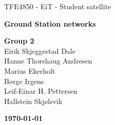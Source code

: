 \begin{titlepage}
\begin{center}

\vspace*{6cm}
{\Huge TFE4850 - EiT - Student satellite}

\vspace*{0.5cm}
{\LARGE\textbf{Ground Station networks}}

\vspace*{0.7cm}
{\Large
	\textbf{Group 2}\\
	Eirik Skjeggestad Dale\\
	Hanne Thorshaug Andresen\\
	Marius Ekerholt\\
	Børge Irgens\\
	Leif-Einar H. Pettersen\\
	Hallstein Skjølsvik
}

{\vfill\textbf{\today}}

\end{center}
\end{titlepage}